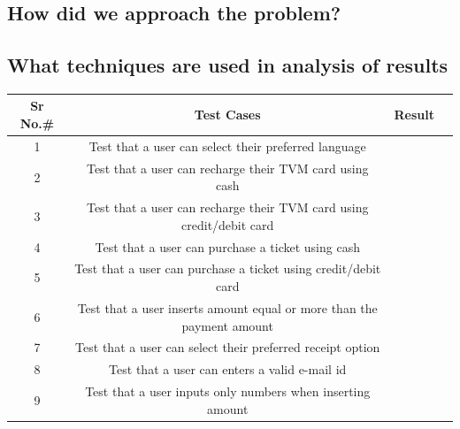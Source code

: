 \documentclass{article}
\begin{document}
\subsection{How did we approach the problem?}

\subsection{What techniques are used in analysis of results}


\begin{center}
    \begin{tabular}{ |c|c|c|c| } 
        \hline
        Sr No.\# & Test Cases & Result \\
        \hline
        1  & Test that a user can select their preferred language  &   \\
        \hline
        2  & Test that a user can recharge their TVM card using cash  &   \\
        \hline
        3  & Test that a user can recharge their TVM card using credit/debit card  &   \\
        \hline
        4  & Test that a user can purchase a ticket using cash  &   \\
        \hline
        5  & Test that a user can purchase a ticket using credit/debit card  &   \\
        \hline
        6  & Test that a user inserts amount equal or more than the payment amount &   \\
        \hline
        7  & Test that a user can select their preferred receipt option  &   \\
        \hline
        8  & Test that a user can enters a valid e-mail id &    \\
        \hline
        9 &  Test that a user inputs only numbers when inserting amount &    \\
        \hline
    \end{tabular}
\end{center}
\end{document}
